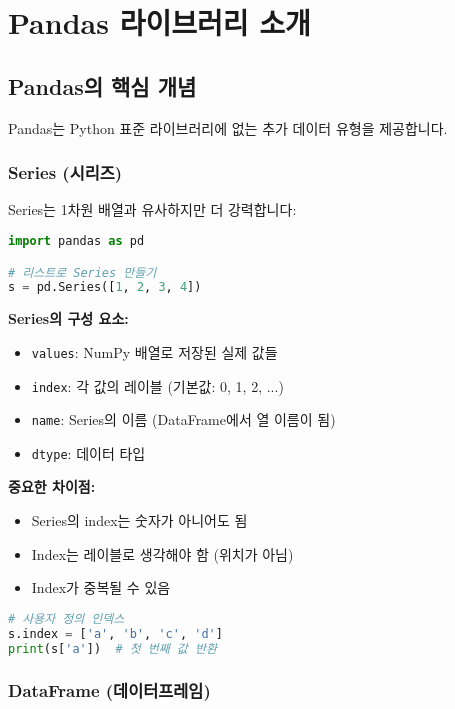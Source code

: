\documentclass[12pt,a4paper]{article}
\begin{document}
\section{Pandas 라이브러리 소개}

\subsection{Pandas의 핵심 개념}

Pandas는 Python 표준 라이브러리에 없는 추가 데이터 유형을 제공합니다.

\subsubsection{Series (시리즈)}

Series는 1차원 배열과 유사하지만 더 강력합니다:

\begin{lstlisting}[language=Python]
import pandas as pd

# 리스트로 Series 만들기
s = pd.Series([1, 2, 3, 4])
\end{lstlisting}

\textbf{Series의 구성 요소:}
\begin{itemize}
    \item \texttt{values}: NumPy 배열로 저장된 실제 값들
    \item \texttt{index}: 각 값의 레이블 (기본값: 0, 1, 2, ...)
    \item \texttt{name}: Series의 이름 (DataFrame에서 열 이름이 됨)
    \item \texttt{dtype}: 데이터 타입
\end{itemize}

\textbf{중요한 차이점:}
\begin{itemize}
    \item Series의 index는 숫자가 아니어도 됨
    \item Index는 레이블로 생각해야 함 (위치가 아님)
    \item Index가 중복될 수 있음
\end{itemize}

\begin{lstlisting}[language=Python]
# 사용자 정의 인덱스
s.index = ['a', 'b', 'c', 'd']
print(s['a'])  # 첫 번째 값 반환
\end{lstlisting}

\subsubsection{DataFrame (데이터프레임)}
\end{document}
